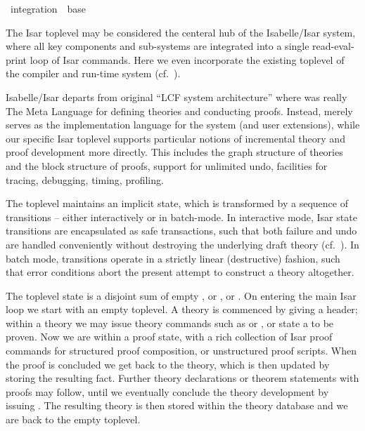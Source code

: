 %
\begin{isabellebody}%
\def\isabellecontext{integration}%
%
\isadelimtheory
\isanewline
\isanewline
\isanewline
%
\endisadelimtheory
%
\isatagtheory
{}\isamarkupfalse%
\ integration\ \ base\ %
\endisatagtheory
{\isafoldtheory}%
%
\isadelimtheory
%
\endisadelimtheory
%
\isamarkuptrue%
%
\isamarkuptrue%
%
\begin{isamarkuptext}%
The Isar toplevel may be considered the centeral hub of the
  Isabelle/Isar system, where all key components and sub-systems are
  integrated into a single read-eval-print loop of Isar commands.
  Here we even incorporate the existing {\ML} toplevel of the compiler
  and run-time system (cf.\ ).

  Isabelle/Isar departs from original ``LCF system architecture''
  where {\ML} was really The Meta Language for defining theories and
  conducting proofs.  Instead, {\ML} merely serves as the
  implementation language for the system (and user extensions), while
  our specific Isar toplevel supports particular notions of
  incremental theory and proof development more directly.  This
  includes the graph structure of theories and the block structure of
  proofs, support for unlimited undo, facilities for tracing,
  debugging, timing, profiling.

  \medskip The toplevel maintains an implicit state, which is
  transformed by a sequence of transitions -- either interactively or
  in batch-mode.  In interactive mode, Isar state transitions are
  encapsulated as safe transactions, such that both failure and undo
  are handled conveniently without destroying the underlying draft
  theory (cf.~).  In batch mode,
  transitions operate in a strictly linear (destructive) fashion, such
  that error conditions abort the present attempt to construct a
  theory altogether.

  The toplevel state is a disjoint sum of empty , or
  , or .  On entering the main Isar loop we
  start with an empty toplevel.  A theory is commenced by giving a
  \isa{{\isasymTHEORY}} header; within a theory we may issue theory
  commands such as \isa{{\isasymCONSTS}} or \isa{{\isasymDEFS}}, or state a
  \isa{{\isasymTHEOREM}} to be proven.  Now we are within a proof state,
  with a rich collection of Isar proof commands for structured proof
  composition, or unstructured proof scripts.  When the proof is
  concluded we get back to the theory, which is then updated by
  storing the resulting fact.  Further theory declarations or theorem
  statements with proofs may follow, until we eventually conclude the
  theory development by issuing \isa{{\isasymEND}}.  The resulting theory
  is then stored within the theory database and we are back to the
  empty toplevel.


\end{isamarkuptext}
\end{isabellebody}

